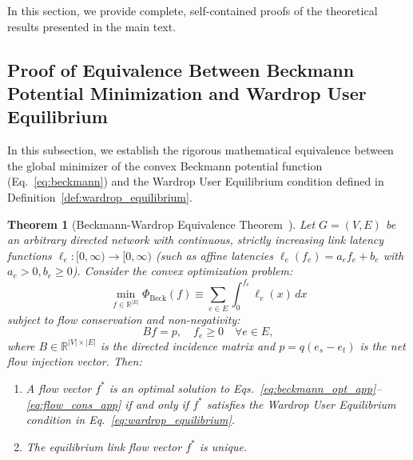 \documentclass[11pt,a4paper]{article}
\newtheorem{theorem}{Theorem}
\begin{document}
In this section, we provide complete, self-contained proofs of the theoretical results presented in the main text.

\subsection{Proof of Equivalence Between Beckmann Potential Minimization and Wardrop User Equilibrium}
\label{subsec:proof_beckmann_wardrop}

In this subsection, we establish the rigorous mathematical equivalence between the global minimizer of the convex Beckmann potential function (Eq.~\eqref{eq:beckmann}) and the Wardrop User Equilibrium condition defined in Definition~\ref{def:wardrop_equilibrium}.

\begin{theorem}[Beckmann-Wardrop Equivalence Theorem~\cite{beckmann1956studies}]
\label{thm:beckmann_wardrop_equivalence}
Let $G = (V, E)$ be an arbitrary directed network with continuous, strictly increasing link latency functions $\ell_e: [0, \infty) \to [0, \infty)$ (such as affine latencies $\ell_e(f_e) = a_e f_e + b_e$ with $a_e > 0, b_e \ge 0$). Consider the convex optimization problem:
\begin{equation}
\label{eq:beckmann_opt_app}
\min_{f \in \mathbb{R}^{|E|}} \Phi_{\text{Beck}}(f) \equiv \sum_{e \in E} \int_0^{f_e} \ell_e(x) \, dx
\end{equation}
subject to flow conservation and non-negativity:
\begin{equation}
\label{eq:flow_cons_app}
B f = p, \quad f_e \ge 0 \quad \forall e \in E,
\end{equation}
where $B \in \mathbb{R}^{|V| \times |E|}$ is the directed incidence matrix and $p = q(e_s - e_t)$ is the net flow injection vector. Then:
\begin{enumerate}
    \item A flow vector $f^*$ is an optimal solution to Eqs.~\eqref{eq:beckmann_opt_app}--\eqref{eq:flow_cons_app} if and only if $f^*$ satisfies the Wardrop User Equilibrium condition in Eq.~\eqref{eq:wardrop_equilibrium}.
    \item The equilibrium link flow vector $f^*$ is unique.
\end{enumerate}
\end{theorem}
\end{document}
